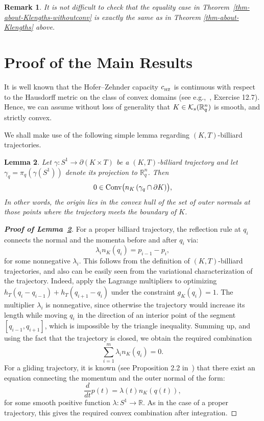 \documentclass[11pt]{article}
\newtheorem{lemma}{Lemma}[section]
\newtheorem{remark}[lemma]{Remark}
\begin{document}
{\begin{remark} {\rm 
It is not difficult to check that the equality case in Theorem~\ref{thm-about-Klengths-withoutconv} is exactly  the same as in Theorem \ref{thm-about-Klengths} above. }
\end{remark}





\section{Proof of the Main Results} \label{sec-proof-of-main-result}

It is well known that the Hofer--Zehnder capacity $c_{_{\rm HZ}}$ 
is continuous with respect to the Hausdorff metric on the class of convex domains 
(see e.g.,~\cite{MS}, Exercise 12.7). Hence, we can assume without loss of generality that $K \in {\cal K}_s({\mathbb R}_q^{n})$ is  smooth, and strictly convex. 


We shall make use of the following simple lemma regarding $(K,T)$-billiard trajectories. 

\begin{lemma}\label{lem:0inconvnormals}
Let $\gamma:S^1\to \partial (K\times T)$ be a $(K,T)$-billiard trajectory and let $\gamma_q = \pi_q(\gamma(S^1))$ denote its projection to ${\mathbb R}_q^n$. Then 
$$
0\in \mathop{\rm Conv}\bigl( n_K\left(\gamma_q \cap \partial K\right) \bigr), 
$$
In other words, the origin lies in the convex hull of the set of outer normals at those points where the trajectory meets the boundary of $K$. 
\end{lemma}

\begin{proof}[{\bf Proof of Lemma~\ref{lem:0inconvnormals}}]
For a proper billiard trajectory, the reflection rule at $q_i$ connects the normal and the momenta before and after $q_i$ via:
$$
\lambda_i n_K(q_i) = p_{i-1} - p_i,
$$
for some nonnegative $\lambda_i$. This follows from the definition of $(K,T)$-billiard trajectories, and also can be easily seen from the variational characterization of the trajectory. Indeed, apply the Lagrange multipliers to optimizing $h_T(q_i-q_{i-1}) + h_T(q_{i+1}-q_{i}) $ %
under the constraint $g_K(q_i)=1$. The multiplier $\lambda_i$ is nonnegative, since otherwise the trajectory would increase its length while moving $q_i$ in the direction of an interior point of the segment $[q_{i-1}, q_{i+1}]$, which is impossible by the triangle inequality. Summing up, and using the fact that the trajectory is closed, we obtain the required combination
$$
\sum_{i=1}^{m} \lambda_i n_K(q_i) = 0.
$$
For a gliding trajectory, it is known (see Proposition 2.2 in~\cite{AAO1}) that there exist an equation connecting the momentum and the outer normal of the form:
$$
\frac{d}{dt} p(t) = \lambda(t) n_K(q(t)),
$$
for some smooth positive function $\lambda : S^1 \rightarrow {\mathbb R}$. As in the case of a proper trajectory, this gives the required convex combination after integration.
\end{proof}


}
\end{document}
